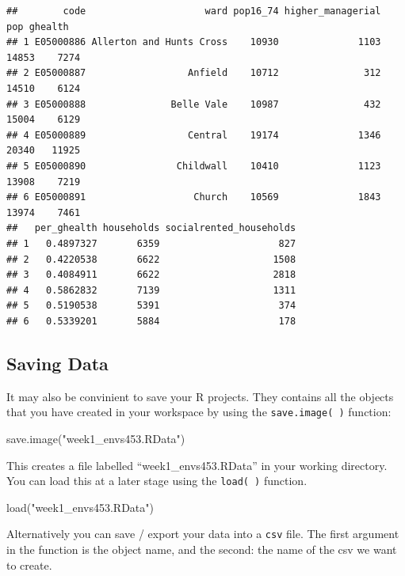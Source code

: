\documentclass[
]{book}
\newenvironment{Shaded}{\begin{snugshade}}{\end{snugshade}}
\newcommand{\FunctionTok}[1]{\textcolor[rgb]{0.00,0.00,0.00}{#1}}
\newcommand{\NormalTok}[1]{#1}
\newcommand{\StringTok}[1]{\textcolor[rgb]{0.31,0.60,0.02}{#1}}
\begin{document}
\begin{verbatim}
##        code                     ward pop16_74 higher_managerial   pop ghealth
## 1 E05000886 Allerton and Hunts Cross    10930              1103 14853    7274
## 2 E05000887                  Anfield    10712               312 14510    6124
## 3 E05000888               Belle Vale    10987               432 15004    6129
## 4 E05000889                  Central    19174              1346 20340   11925
## 5 E05000890                Childwall    10410              1123 13908    7219
## 6 E05000891                   Church    10569              1843 13974    7461
##   per_ghealth households socialrented_households
## 1   0.4897327       6359                     827
## 2   0.4220538       6622                    1508
## 3   0.4084911       6622                    2818
## 4   0.5862832       7139                    1311
## 5   0.5190538       5391                     374
## 6   0.5339201       5884                     178
\end{verbatim}

\hypertarget{saving-data}{%
\subsection{Saving Data}\label{saving-data}}

It may also be convinient to save your R projects. They contains all the objects that you have created in your workspace by using the \texttt{save.image(\ )} function:

\begin{Shaded}
\begin{Highlighting}[]
\FunctionTok{save.image}\NormalTok{(}\StringTok{"week1\_envs453.RData"}\NormalTok{)}
\end{Highlighting}
\end{Shaded}

This creates a file labelled ``week1\_envs453.RData'' in your working directory. You can load this at a later stage using the \texttt{load(\ )} function.

\begin{Shaded}
\begin{Highlighting}[]
\FunctionTok{load}\NormalTok{(}\StringTok{"week1\_envs453.RData"}\NormalTok{)}
\end{Highlighting}
\end{Shaded}

Alternatively you can save / export your data into a \texttt{csv} file. The first argument in the function is the object name, and the second: the name of the csv we want to create.
\end{document}
